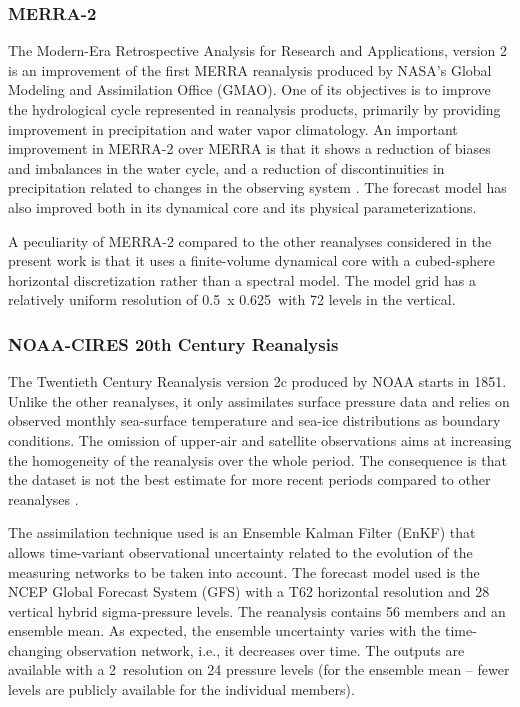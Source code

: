 \documentclass{ametsoc}
\begin{document}
	
	\subsubsection{MERRA-2}
	
	The Modern-Era Retrospective Analysis for Research and Applications, version 2 \citep[MERRA-2 -- ][]{Gelaro2017} is an improvement of the first MERRA reanalysis \citep{Rienecker2011} produced by NASA's Global Modeling and Assimilation Office (GMAO). One of its objectives is to improve the hydrological cycle represented in reanalysis products, primarily by providing improvement in precipitation and water vapor climatology. An important improvement in MERRA-2 over MERRA is that it shows a reduction of biases and imbalances in the water cycle, and a reduction of discontinuities in precipitation related to changes in the observing system \citep{Gelaro2017}. The forecast model has also improved both in its dynamical core and its physical parameterizations.
	
	A peculiarity of MERRA-2 compared to the other reanalyses considered in the present work is that it uses a finite-volume dynamical core with a cubed-sphere horizontal discretization rather than a spectral model. The model grid has a relatively uniform resolution of 0.5\degree\ x 0.625\degree\ with 72 levels in the vertical.
	
	
	\subsubsection{NOAA-CIRES 20th Century Reanalysis}
	
	The Twentieth Century Reanalysis version 2c \citep[20CR-2c --][]{Compo2011} produced by NOAA starts in 1851. Unlike the other reanalyses, it only assimilates surface pressure data and relies on observed monthly sea-surface temperature and sea-ice distributions as boundary conditions. The omission of upper-air and satellite observations aims at increasing the homogeneity of the reanalysis over the whole period. The consequence is that the dataset is not the best estimate for more recent periods compared to other reanalyses \citep{Poli2017}.
	
	The assimilation technique used is an Ensemble Kalman Filter (EnKF) that allows time-variant observational uncertainty related to the evolution of the measuring networks to be taken into account. The forecast model used is the NCEP Global Forecast System (GFS) with a T62 horizontal resolution and 28 vertical hybrid sigma-pressure levels. The reanalysis contains 56 members and an ensemble mean. As expected, the ensemble uncertainty varies with the time-changing observation network, i.e., it decreases over time. The outputs are available with a 2\degree\ resolution on 24 pressure levels (for the ensemble mean -- fewer levels are publicly available for the individual members).
	
\end{document}
